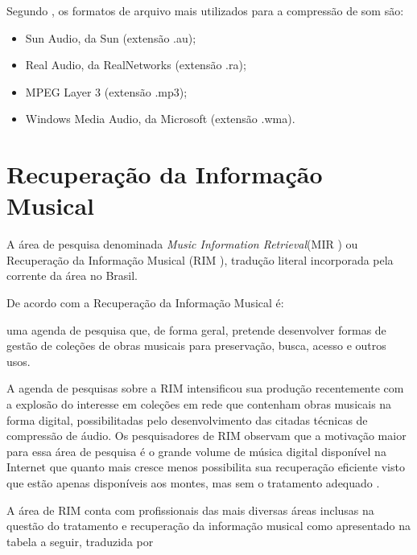 Segundo , os formatos de arquivo mais utilizados para a compressão de som são:

\begin{itemize}
   \item Sun Audio, da Sun (extensão .au);
   \item Real Audio, da RealNetworks (extensão .ra);
   \item MPEG Layer 3 (extensão .mp3);
   \item Windows Media Audio, da Microsoft (extensão .wma).
 \end{itemize}

\section{Recuperação da Informação Musical}

A área de pesquisa denominada \textit{Music Information Retrieval}(MIR ) ou Recuperação da Informação Musical (RIM ), tradução literal incorporada pela corrente da área no Brasil.

De acordo com  a Recuperação da Informação Musical é:

\begin{citacao}
[...] uma agenda de pesquisa que, de forma geral, pretende desenvolver formas de gestão de coleções de obras musicais para preservação, busca, acesso e outros usos.
\end{citacao}

A agenda de pesquisas sobre a RIM intensificou sua produção recentemente com a explosão do interesse em coleções em rede que contenham obras musicais na forma digital, possibilitadas pelo desenvolvimento das citadas técnicas de compressão de áudio. Os pesquisadores de RIM observam que a motivação maior para essa área de pesquisa é o grande volume de música digital disponível na Internet que quanto mais cresce menos possibilita sua recuperação eficiente visto que estão apenas disponíveis aos montes, mas sem o tratamento adequado \cite{gomes2015}.

A área de RIM conta com profissionais das mais diversas áreas inclusas na questão do tratamento e recuperação da informação musical como apresentado na tabela a seguir, traduzida por 

